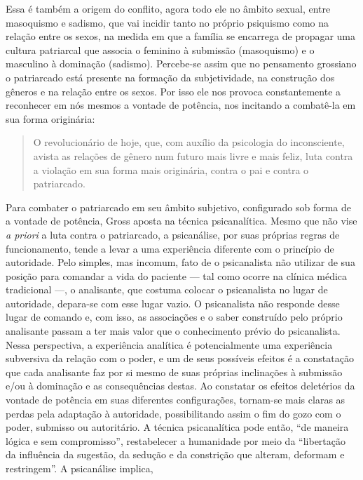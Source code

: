 Essa é também a origem do conflito, agora todo ele no âmbito sexual,
entre masoquismo e sadismo, que vai incidir tanto no próprio psiquismo
como na relação entre os sexos, na medida em que a família se encarrega
de propagar uma cultura patriarcal que associa o feminino à submissão
(masoquismo) e o masculino à dominação (sadismo). Percebe-se assim que
no pensamento grossiano o patriarcado está presente na formação da
subjetividade, na construção dos gêneros e na relação entre os sexos.
Por isso ele nos provoca constantemente a reconhecer em nós mesmos a
vontade de potência, nos incitando a combatê-la em sua forma originária:

\begin{quote}
O revolucionário de hoje, que, com auxílio da psicologia do
inconsciente, avista as relações de gênero num futuro mais livre e mais
feliz, luta contra a violação em sua forma mais originária, contra o pai
e contra o patriarcado.
\end{quote}

Para combater o patriarcado em seu âmbito subjetivo, configurado sob
forma de a vontade de potência, Gross aposta na técnica psicanalítica.
Mesmo que não vise \emph{a priori} a luta contra o patriarcado, a
psicanálise, por suas próprias regras de funcionamento, tende a levar a
uma experiência diferente com o princípio de autoridade. Pelo simples,
mas incomum, fato de o psicanalista não utilizar de sua posição para
comandar a vida do paciente --- tal como ocorre na clínica médica
tradicional ---, o analisante, que costuma colocar o psicanalista no
lugar de autoridade, depara-se com esse lugar vazio. O psicanalista não
responde desse lugar de comando e, com isso, as associações e o saber
construído pelo próprio analisante passam a ter mais valor que o
conhecimento prévio do psicanalista. Nessa perspectiva, a experiência
analítica é potencialmente uma experiência subversiva da relação com o
poder, e um de seus possíveis efeitos é a constatação que cada
analisante faz por si mesmo de suas próprias inclinações à submissão
e/ou à dominação e as consequências destas. Ao constatar os efeitos
deletérios da vontade de potência em suas diferentes configurações,
tornam-se mais claras as perdas pela adaptação à autoridade,
possibilitando assim o fim do gozo com o poder, submisso ou autoritário.
A técnica psicanalítica pode então, ``de maneira lógica e sem
compromisso'', restabelecer a humanidade por meio da ``libertação da
influência da sugestão, da sedução e da constrição que alteram, deformam
e restringem''. A psicanálise implica,

